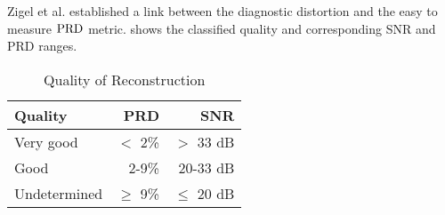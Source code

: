 Zigel et al. \cite{zigel2000weighted} established 
a link between the diagnostic distortion and
the easy to measure $\mathrm{PRD}$ metric.
 shows the classified quality
and corresponding SNR and PRD ranges.
\begin{table}[ht]
\centering
\caption{Quality of Reconstruction \cite{zigel2000weighted}}
\begin{tabular}{lrr}
\toprule
Quality & PRD & SNR \\
\midrule 
Very good & $<$ 2\% & $>$ 33 dB \\
Good & 2-9\% & 20-33 dB \\
Undetermined & $\geq$ 9\% & $\leq$ 20 dB\\
\bottomrule
\end{tabular}
\label{tbl-quality-prd-snr}
\end{table}
